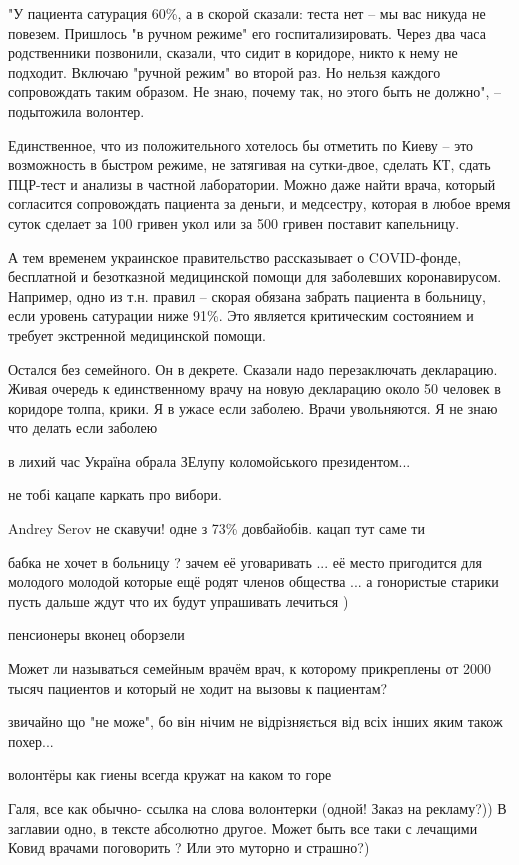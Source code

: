 "У пациента сатурация 60\%, а в скорой сказали: теста нет – мы вас никуда не
повезем. Пришлось "в ручном режиме" его госпитализировать. Через два часа
родственники позвонили, сказали, что сидит в коридоре, никто к нему не
подходит. Включаю "ручной режим" во второй раз. Но нельзя каждого сопровождать
таким образом. Не знаю, почему так, но этого быть не должно", – подытожила
волонтер.

Единственное, что из положительного хотелось бы отметить по Киеву – это
возможность в быстром режиме, не затягивая на сутки-двое, сделать КТ, сдать
ПЦР-тест и анализы в частной лаборатории. Можно даже найти врача, который
согласится сопровождать пациента за деньги, и медсестру, которая в любое время
суток сделает за 100 гривен укол или за 500 гривен поставит капельницу.

А тем временем украинское правительство рассказывает о COVID-фонде, бесплатной
и безотказной медицинской помощи для заболевших коронавирусом. Например, одно
из т.н. правил – скорая обязана забрать пациента в больницу, если уровень
сатурации ниже 91\%. Это является критическим состоянием и требует экстренной
медицинской помощи.

\begin{itemize}


Остался без семейного. Он в декрете. Сказали надо перезаключать декларацию.
Живая очередь к единственному врачу на новую декларацию около 50 человек в
коридоре толпа, крики. Я в ужасе если заболею. Врачи увольняются. Я не знаю что
делать если заболею

в лихий час Україна обрала ЗЕлупу коломойського президентом...

не тобі кацапе каркать про вибори.

Andrey Serov не скавучи! одне з 73\% довбайобів. кацап тут саме ти

бабка не хочет в больницу ? зачем её уговаривать ... её место пригодится для
молодого молодой которые ещё родят членов общества ... а гонористые старики
пусть дальше ждут что их будут упрашивать лечиться )

пенсионеры вконец оборзели


Может ли называться семейным врачём врач, к которому прикреплены от 2000 тысяч
пациентов и который не ходит на вызовы к пациентам?


звичайно що "не може", бо він нічим не відрізняється від всіх інших яким також
похер...

волонтёры как гиены всегда кружат на каком то горе


Галя, все как обычно- ссылка на слова волонтерки (одной! Заказ на рекламу?)) В
заглавии одно, в тексте абсолютно другое. Может быть все таки с лечащими Ковид
врачами поговорить ? Или это муторно и страшно?)
\end{itemize}
